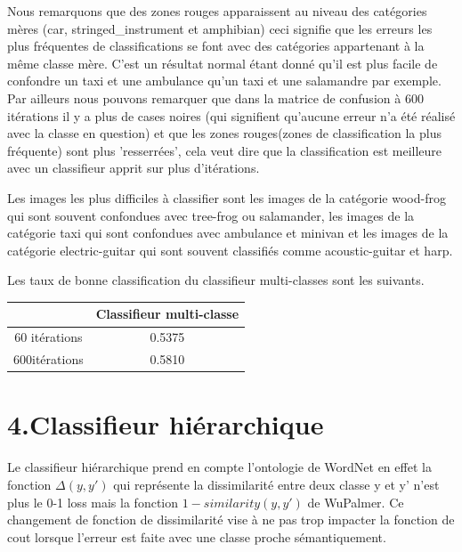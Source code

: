 \documentclass[a4paper,11pt]{report}
\begin{document}
\noindent
 Nous remarquons que des zones rouges apparaissent au niveau des catégories mères (car, stringed\_instrument et amphibian) ceci signifie que les erreurs les plus fréquentes de classifications se font avec des catégories appartenant à la même classe mère. C'est un résultat normal étant donné qu'il est plus facile de confondre un taxi et une ambulance qu'un taxi et une salamandre par exemple. Par ailleurs nous pouvons remarquer que dans la matrice de confusion à 600 itérations il y a plus de cases noires (qui signifient qu'aucune erreur n'a été réalisé avec la classe en question) et que les zones rouges(zones de classification la plus fréquente) sont plus 'resserrées', cela veut dire que la classification est meilleure avec un classifieur apprit sur plus d'itérations. 
 
 Les images les plus difficiles à classifier sont les images de la catégorie wood-frog qui sont souvent confondues avec tree-frog ou salamander, les images de la catégorie taxi qui sont confondues avec ambulance et minivan et les images de la catégorie electric-guitar qui sont souvent classifiés comme acoustic-guitar et harp.

Les taux de bonne classification du classifieur multi-classes sont les suivants.\\
\begin{center}
\begin{tabular}{|c|c|}
\hline
 & Classifieur multi-classe \\
\hline
\hline
60 itérations & 0.5375\\
600itérations & 0.5810\\
\hline
\end{tabular}
\end{center}


\section*{4.Classifieur hiérarchique}
Le classifieur hiérarchique prend en compte l'ontologie de WordNet en effet la fonction $\Delta(y,y')$ qui représente la dissimilarité entre deux classe y et y' n'est plus le 0-1 loss mais la fonction $1-similarity(y,y')$ de WuPalmer. Ce changement de fonction de dissimilarité vise à ne pas trop impacter la fonction de cout lorsque l'erreur est faite avec une classe proche sémantiquement. 
\end{document}
